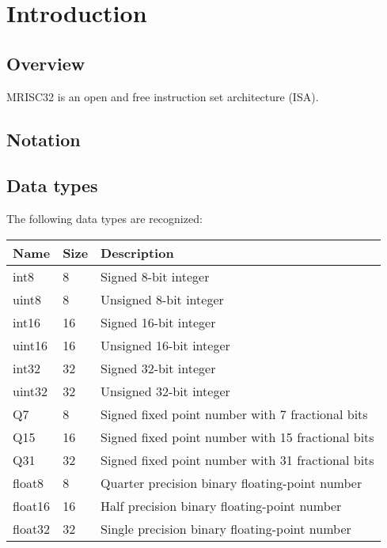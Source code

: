 %

\chapter{Introduction}

\section{Overview}

MRISC32 is an open and free instruction set architecture (ISA).

\section{Notation}

\tbd

\section{Data types}

The following data types are recognized:

\begin{tabular}{|l|l|p{140pt}|}
  \hline
  \textbf{Name} & \textbf{Size} & \textbf{Description} \\
  \hline
  int8 & 8 & Signed 8-bit integer \\
  \hline
  uint8 & 8 & Unsigned 8-bit integer \\
  \hline
  int16 & 16 & Signed 16-bit integer \\
  \hline
  uint16 & 16 & Unsigned 16-bit integer \\
  \hline
  int32 & 32 & Signed 32-bit integer \\
  \hline
  uint32 & 32 & Unsigned 32-bit integer \\
  \hline
  Q7 & 8 & Signed fixed point number with 7 fractional bits \\
  \hline
  Q15 & 16 & Signed fixed point number with 15 fractional bits \\
  \hline
  Q31 & 32 & Signed fixed point number with 31 fractional bits \\
  \hline
  float8 & 8 & Quarter precision binary floating-point number \\
  \hline
  float16 & 16 & Half precision binary floating-point number \\
  \hline
  float32 & 32 & Single precision binary floating-point number \\
  \hline
\end{tabular}

